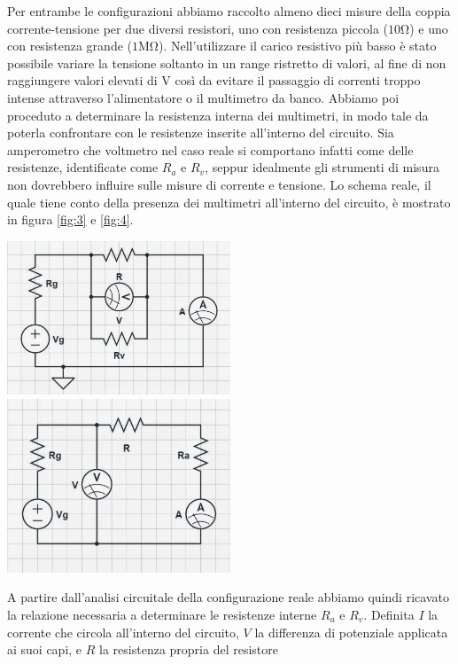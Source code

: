 \documentclass[a4paper]{article}
\begin{document}
Per entrambe le configurazioni abbiamo raccolto almeno dieci misure della coppia corrente-tensione per due diversi resistori, uno con resistenza piccola ($10\si{\ohm}$) e uno con resistenza grande ($1\si{\mega\ohm}$).
Nell'utilizzare il carico resistivo più basso è stato possibile variare la tensione soltanto in un range ristretto di valori,
al fine di non raggiungere valori elevati di V così da evitare il passaggio di correnti troppo intense attraverso l'alimentatore o il multimetro da banco.
Abbiamo poi proceduto a determinare la resistenza interna dei multimetri, in modo tale da poterla confrontare con le resistenze inserite all'interno del circuito.
Sia amperometro che voltmetro nel caso reale si comportano infatti come delle resistenze, identificate come \( \mathit{R_a} \) e \( \mathit{R_v} \),
seppur idealmente gli strumenti di misura non dovrebbero influire sulle misure di corrente e tensione.
Lo schema reale, il quale tiene conto della presenza dei multimetri all'interno del circuito, è mostrato in figura \ref{fig:3} e \ref{fig:4}.
\begin{center}
\includegraphics[width=0.5\textwidth]{grafici/conf_1_bias.jpg}
\label{fig:3}
\includegraphics[width=0.5\textwidth]{grafici/conf_2_bias.jpg}
\label{fig:4}
\end{center}
A partire dall'analisi circuitale della configurazione reale abbiamo quindi ricavato la relazione necessaria a determinare le resistenze interne \( \mathit{R_a} \) e \( \mathit{R_v} \).
Definita \( \mathit{I} \) la corrente che circola all'interno del circuito, \( \mathit{V} \) la differenza di potenziale applicata ai suoi capi, e \( \mathit{R} \) la resistenza propria del resistore
\end{document}
